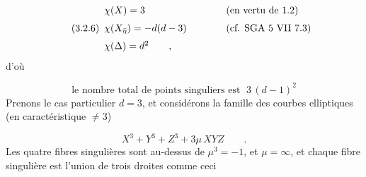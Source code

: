 \begin{equation}\tag{3.2.6}
\begin{array}{l@{\qquad\qquad}l} \chi(X) = 3 & (\text{en vertu de 1.2}) \\[6pt] \chi(X_{\bar{\eta}}) = -d(d-3) & (\text{cf. SGA 5 VII 7.3}) \\[6pt] \chi(\Delta) = d^2 \qquad , & \end{array}
\end{equation}
d'où

\begin{equation}\tag{3.2.7}
\text{le nombre total de points singuliers est } \; 3\,(d-1)^2
\end{equation}
Prenons le cas particulier $d = 3$, et considérons la famille des courbes elliptiques (en caractéristique $\neq 3$)

\begin{equation}\tag{3.2.8}
X^3 + Y^3 + Z^3 + 3\mu\, XYZ \qquad .
\end{equation}
Les quatre fibres singulières sont au-dessus de $\mu^3=-1$, et $\mu = \infty$, et chaque fibre singulière est l'union de trois droites comme ceci

